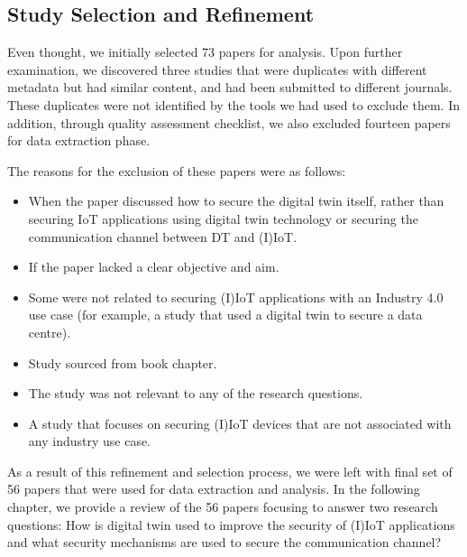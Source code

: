\subsection{Study Selection and Refinement}

Even thought, we initially selected 73 papers for analysis. Upon further examination, we discovered three studies that were duplicates with different metadata but had similar content, and had been submitted to different journals. These duplicates were not identified by the tools we had used to exclude them. In addition, through quality assessment checklist, we also excluded fourteen papers for data extraction phase.

The reasons for the exclusion of these papers were as follows:

\begin{itemize}
    \item When the paper discussed how to secure the digital twin itself, rather than securing IoT applications using digital twin technology or securing the communication channel between DT and (I)IoT. 
    \item If the paper lacked a clear objective and aim.
    \item Some were not related to securing (I)IoT applications with an Industry 4.0 use case (for example, a study that used a digital twin to secure a data centre).
    \item Study sourced from book chapter. 
    \item The study was not relevant to any of the research questions.
    \item A study that focuses on securing (I)IoT devices that are not associated with any industry use case. 
\end{itemize}

As a result of this refinement and selection process, we were left with final set of 56 papers that were used for data extraction and analysis. In the following chapter, we provide a review of the 56 papers focusing to answer two research questions: How is digital twin used to improve the security of (I)IoT applications and what security mechanisms are used to secure the communication channel?    



